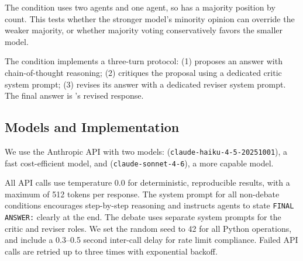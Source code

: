 \begin{table}[t]
\centering
\caption{Five experimental conditions. ``H'' denotes \haiku; ``S'' denotes \sonnet.
Aggregation applies to 3-agent conditions only.}
\label{tab:conditions}
\end{table}

The \hetero condition uses two \haiku agents and one \sonnet agent, so \haiku
has a majority position by count. This tests whether the stronger model's
minority opinion can override the weaker majority, or whether majority voting
conservatively favors the smaller model.

The \debate condition implements a three-turn protocol:
(1) \haiku proposes an answer with chain-of-thought reasoning;
(2) \sonnet critiques the proposal using a dedicated critic system prompt;
(3) \haiku revises its answer with a dedicated reviser system prompt.
The final answer is \haiku's revised response.

\subsection{Models and Implementation}

We use the Anthropic API with two models:
\haiku (\texttt{claude-haiku-4-5-20251001}), a fast cost-efficient model,
and \sonnet (\texttt{claude-sonnet-4-6}), a more capable model.

All API calls use temperature 0.0 for deterministic, reproducible results,
with a maximum of 512 tokens per response.
The system prompt for all non-debate conditions encourages step-by-step reasoning
and instructs agents to state \texttt{FINAL ANSWER:} clearly at the end.
The debate uses separate system prompts for the critic and reviser roles.
We set the random seed to 42 for all Python operations,
and include a 0.3--0.5 second inter-call delay for rate limit compliance.
Failed API calls are retried up to three times with exponential backoff.

